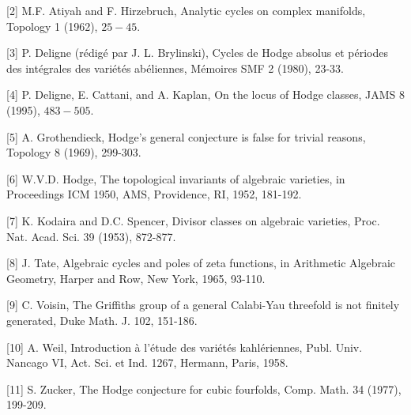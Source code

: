 \documentclass[12pt,twoside]{book}
\theoremstyle{plain}
\theoremstyle{definition}
\theoremstyle{remark}
\numberwithin{equation}{section}
\begin{document}
[2] M.F. Atiyah and F. Hirzebruch, Analytic cycles on complex manifolds, Topology 1 (1962), $25-45$.

[3] P. Deligne (rédigé par J. L. Brylinski), Cycles de Hodge absolus et périodes des intégrales des variétés abéliennes, Mémoires SMF 2 (1980), 23-33.

[4] P. Deligne, E. Cattani, and A. Kaplan, On the locus of Hodge classes, JAMS 8 (1995), $483-505$.

[5] A. Grothendieck, Hodge's general conjecture is false for trivial reasons, Topology 8 (1969), 299-303.

[6] W.V.D. Hodge, The topological invariants of algebraic varieties, in Proceedings ICM 1950, AMS, Providence, RI, 1952, 181-192.

[7] K. Kodaira and D.C. Spencer, Divisor classes on algebraic varieties, Proc. Nat. Acad. Sci. 39 (1953), 872-877.

[8] J. Tate, Algebraic cycles and poles of zeta functions, in Arithmetic Algebraic Geometry, Harper and Row, New York, 1965, 93-110.

[9] C. Voisin, The Griffiths group of a general Calabi-Yau threefold is not finitely generated, Duke Math. J. 102, 151-186.

[10] A. Weil, Introduction à l'étude des variétés kahlériennes, Publ. Univ. Nancago VI, Act. Sci. et Ind. 1267, Hermann, Paris, 1958.

[11] S. Zucker, The Hodge conjecture for cubic fourfolds, Comp. Math. 34 (1977), 199-209.
\end{document}
